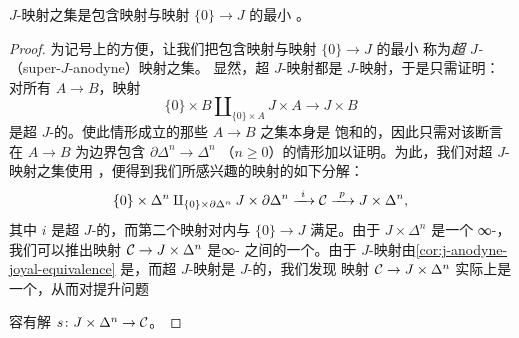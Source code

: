 \begin{proposition}\label{prop:j-anodyne-generated}
$J$-\trAnodyne{}映射之集是包含\trInnerAnodyne{}映射与映射 $\{0\} \to J$ 的最小%
\trSaturatedSet{}。
\end{proposition}

\begin{proof}
为记号上的方便，让我们把包含\trInnerAnodyne{}映射与映射 $\{0\} \to J$ 的最小%
\trSaturatedSet{}称为\emph{超 $J$-\trAnodyne{}}（super-$J$-anodyne）映射之集。
显然，超 $J$-\trAnodyne{}映射都是 $J$-\trAnodyne{}映射，于是只需证明：对所有%
\trMonomorphism{} $A \to B$，\trPushoutProduct{}映射
\[
\{0\} \times B \amalg_{\{0\} \times A} J \times A \longrightarrow J \times B
\]
是超 $J$-\trAnodyne{}的。使此情形成立的那些\trMonomorphism{} $A \to B$ 之集本身是
饱和的，因此只需对该断言在 $A \to B$ 为边界包含 $\partial\Delta^n \to \Delta^n$
（$n \ge 0$）的情形加以证明。为此，我们对超 $J$-\trAnodyne{}映射之集使用%
\trSmallObjectArgument{}，便得到我们所感兴趣的映射的如下分解：
\[
\{0\} \times \Delta^n \amalg_{\{0\} \times \partial\Delta^n}
J \times \partial\Delta^n
\xrightarrow{\ i\ } \mathcal{C} \xrightarrow{\ p\ } J \times \Delta^n,
\]
其中 $i$ 是超 $J$-\trAnodyne{}的，而第二个映射对内\trHornInclusion{}与
$\{0\} \to J$ 满足\trRightLiftingProperty{}。由于 $J \times \Delta^n$ 是一个%
∞-\trCategory{}，我们可以推出映射 $\mathcal{C} \to J \times \Delta^n$ 是∞-\trCategories{}%
之间的一个\trIsofibration{}。由于 $J$-\trAnodyne{}映射由\cref{cor:j-anodyne-joyal-equivalence}
是\trJoyalEquivalence{}，而超 $J$-\trAnodyne{}映射是 $J$-\trAnodyne{}的，我们发现
映射 $\mathcal{C} \to J \times \Delta^n$ 实际上是一个\trTrivialFibration{}，从而对提升问题
\begin{center}
\end{center}
容有解 $s\colon J \times \Delta^n \to \mathcal{C}$。


\end{proof}
